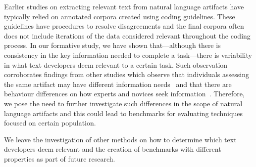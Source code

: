 Earlier studies
on extracting relevant
text from natural language artifacts have typically
relied on annotated corpora created using coding guidelines.
These guidelines have procedures to resolve disagreements and the 
final corpora often does not include iterations of the data considered relevant 
throughout the coding process.
In our formative study, we have shown that---although there is consistency in the key information 
needed to complete a task---there is variability in what text developers deem relevant to a 
certain task. Such observation corroborates 
findings from other studies which observe that 
individuals assessing the same artifact may have different
information needs~\cite{Bavota2016, Walters2014}
and that there are behaviour differences on how
experts and novices seek information~\cite{Crosby1990, Busjahn2015}.
Therefore, we pose the need to further investigate
 such differences in the scope of
natural language artifacts and this  
could lead to benchmarks for evaluating techniques
focused on certain population.



We leave the investigation of other methods on how to determine which text 
developers deem relevant 
and the creation of benchmarks with different properties
as part of future research.
